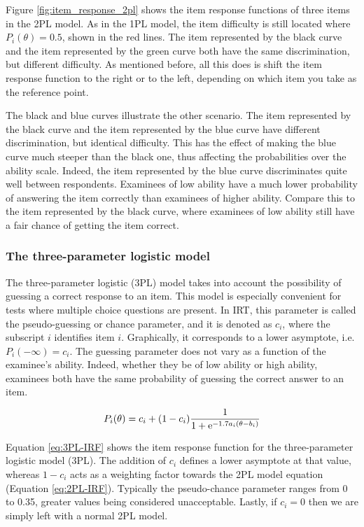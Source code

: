 Figure \ref{fig:item_response_2pl} shows the item response functions of three items in the 2PL model. As in the 1PL model, the item difficulty is still located where $P_i(\theta)=0.5$, shown in the red lines. The item represented by the black curve and the item represented by the green curve both have the same discrimination, but different difficulty. As mentioned before, all this does is shift the item response function to the right or to the left, depending on which item you take as the reference point. \newline

The black and blue curves illustrate the other scenario. The item represented by the black curve and the item represented by the blue curve have different discrimination, but identical difficulty. This has the effect of making the blue curve much steeper than the black one, thus affecting the probabilities over the ability scale. Indeed, the item represented by the blue curve discriminates quite well between respondents. Examinees of low ability have a much lower probability of answering the item correctly than examinees of higher ability. Compare this to the item represented by the black curve, where examinees of low ability still have a fair chance of getting the item correct.

\subsubsection{The three-parameter logistic model}
The three-parameter logistic (3PL) model takes into account the possibility of guessing a correct response to an item. This model is especially convenient for tests where multiple choice questions are present. In IRT, this parameter is called the pseudo-guessing or chance parameter, and it is denoted as $c_i$, where the subscript $i$ identifies item $i$. Graphically, it corresponds to a lower asymptote, i.e. $P_i(-\infty)=c_i$. The guessing parameter does not vary as a function of the examinee's ability. Indeed, whether they be of low ability or high ability, examinees both have the same probability of guessing the correct answer to an item.

\begin{equation} \label{eq:3PL-IRF}
P_i(\theta) = c_i + (1-c_i) \frac{1}{1 + \mathrm{e}^{-1.7a_i(\theta - b_i)}}
\end{equation}

Equation \eqref{eq:3PL-IRF} shows the item response function for the three-parameter logistic model (3PL). The addition of $c_i$ defines a lower asymptote at that value, whereas $1-c_i$ acts as a weighting factor towards the 2PL model equation (Equation \eqref{eq:2PL-IRF}). Typically the pseudo-chance parameter ranges from 0 to 0.35, greater values being considered unacceptable. Lastly, if $c_i=0$ then we are simply left with a normal 2PL model.

